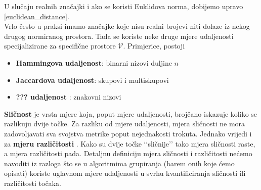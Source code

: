 \documentclass[times, utf8, zavrsni]{fer}
\begin{document}
U slučaju realnih značajki i ako se koristi Euklidova norma, dobijemo upravo \ref{euclidean_distance}.\\
Vrlo često u praksi imamo značajke koje nisu realni brojevi niti dolaze iz nekog drugog normiranog prostora. Tada se koriste neke druge mjere udaljenosti specijalizirane za specifične prostore \(\mathcal{V}\). Primjerice, postoji
\begin{itemize}
    \item \textbf{Hammingova udaljenost}: binarni nizovi duljine $n$
    \item \textbf{Jaccardova udaljenost}: skupovi i multiskupovi
    \item \textbf{??? udaljenost} : znakovni nizovi
\end{itemize}
\textbf{Sličnost}  je vrsta mjere koja, poput mjere udaljenosti, brojčano iskazuje koliko se razlikuju dvije točke. Za razliku od mjere udaljenosti, mjera sličnosti ne mora zadovoljavati sva svojstva metrike poput nejednakosti trokuta. Jednako vrijedi i za \textbf{mjeru različitosti} . Kako su dvije točke ‘‘sličnije’’ tako mjera sličnosti raste, a mjera različitosti pada. Detaljnu definiciju mjera sličnosti i različitosti nećemo navoditi iz razloga što se u algoritmima grupiranja (barem onih koje ćemo opisati) koriste uglavnom mjere udaljenosti u svrhu kvantificiranja sličnosti ili različitosti točaka.
\end{document}
